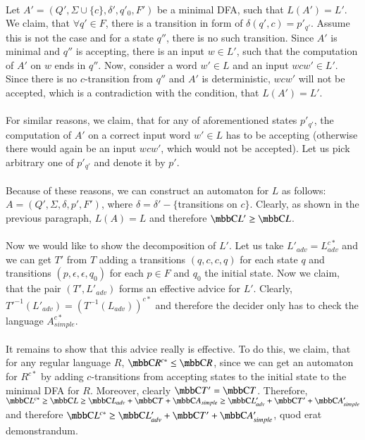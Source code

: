 \paragraph{}
Let $A' = (Q', \Sigma \cup \{c\}, \delta', q'_0, F')$ be a minimal DFA, such that $L(A') = L'$. We claim, that $\forall q' \in F$, there is a transition in form of $\delta(q', c) = p'_{q'}$. Assume this is not the case and for a state $q''$, there is no such transition. Since $A'$ is minimal and $q''$ is accepting, there is an input $w \in L'$, such that the computation of $A'$ on $w$ ends in $q''$. Now, consider a word $w' \in L$ and an input $wcw' \in L'$. Since there is no $c$-transition from $q''$ and $A'$ is deterministic, $wcw'$ will not be accepted, which is a contradiction with the condition, that $L(A') = L'$.

\paragraph{}
For similar reasons, we claim, that for any of aforementioned states $p'_{q'}$, the computation of $A'$ on a correct input word $w' \in L$ has to be accepting (otherwise there would again be an input $wcw'$, which would not be accepted). Let us pick arbitrary one of $p'_{q'}$ and denote it by $p'$.

\paragraph{}
Because of these reasons, we can construct an automaton for $L$ as follows: $A = (Q',  \Sigma, \delta, p',  F')$, where $\delta = \delta' - \{$transitions on $c \}$. Clearly, as shown in the previous paragraph, $L(A) = L$ and therefore $\C{L'} \geq \C{L}$.

\paragraph{}
Now we would like to show the decomposition of $L'$. Let us take $L'_{adv} = L_{adv}^{c*}$ and we can get $T'$ from $T$ adding a transitions $(q, c, c, q)$ for each state $q$ and transitions $(p, \epsilon, \epsilon, q_0)$ for each $p \in F$ and $q_0$ the initial state. Now we claim, that the pair $(T', L'_{adv})$ forms an effective advice for $L'$. Clearly, $T'^{-1}(L'_{adv}) = (T^{-1}(L_{adv}))^{c*}$ and therefore the decider only has to check the language $A_{simple}^{c*}$.

\paragraph{}
It remains to show that this advice really is effective. To do this, we claim, that for any regular language $R$, $\C{R^{c*}} \leq \C{R}$, since we can get an automaton for $R^{c*}$ by adding $c$-transitions from accepting states to the initial state to the minimal DFA for $R$. Moreover, clearly $\C{T'} = \C{T}$. Therefore, $\C{L^{c*}} \geq \C{L} \geq \C{L_{adv}} + \C{T} + \C{A_{simple}} \geq \C{L'_{adv}} + \C{T'} + \C{A'_{simple}}$ and therefore $\C{L^{c*}} \geq \C{L'_{adv}} + \C{T'} + \C{A'_{simple}}$, quod erat demonstrandum. \\
\square
